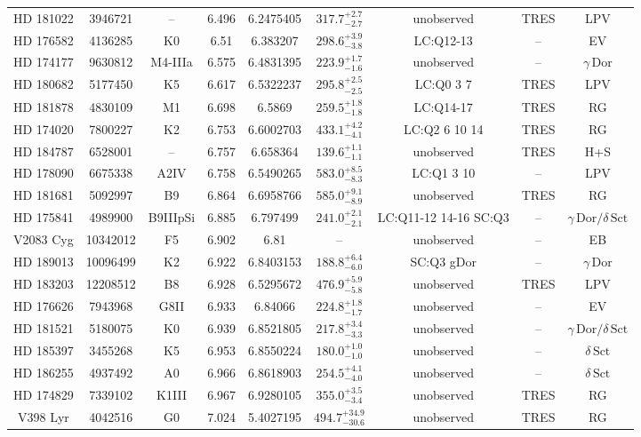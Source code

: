\begin{table*}
\begin{tabular}{ccccccccc}
HD 181022 & 3946721 & -- & 6.496 & 6.2475405 & $317.7^{+2.7}_{-2.7}$ & unobserved & TRES & LPV \\
HD 176582 & 4136285 & K0 & 6.51 & 6.383207 & $298.6^{+3.9}_{-3.8}$ & LC:Q12-13 & -- & EV \\
HD 174177 & 9630812 & M4-IIIa & 6.575 & 6.4831395 & $223.9^{+1.7}_{-1.6}$ & unobserved & -- & $\gamma\,\text{Dor}$ \\
HD 180682 & 5177450 & K5 & 6.617 & 6.5322237 & $295.8^{+2.5}_{-2.5}$ & LC:Q0 3 7 & TRES & LPV \\
HD 181878 & 4830109 & M1 & 6.698 & 6.5869 & $259.5^{+1.8}_{-1.8}$ & LC:Q14-17 & TRES & RG \\
HD 174020 & 7800227 & K2 & 6.753 & 6.6002703 & $433.1^{+4.2}_{-4.1}$ & LC:Q2 6 10 14 & TRES & RG \\
HD 184787 & 6528001 & -- & 6.757 & 6.658364 & $139.6^{+1.1}_{-1.1}$ & unobserved & TRES & H+S \\
HD 178090 & 6675338 & A2IV & 6.758 & 6.5490265 & $583.0^{+8.5}_{-8.3}$ & LC:Q1 3 10 & -- & LPV \\
HD 181681 & 5092997 & B9 & 6.864 & 6.6958766 & $585.0^{+9.1}_{-8.9}$ & unobserved & TRES & RG \\
HD 175841 & 4989900 & B9IIIpSi & 6.885 & 6.797499 & $241.0^{+2.1}_{-2.1}$ & LC:Q11-12 14-16 SC:Q3 & -- & $\gamma\,\text{Dor} /\delta\,\text{Sct}$ \\
V2083 Cyg & 10342012 & F5 & 6.902 & 6.81 & -- & unobserved & -- & EB \\
HD 189013 & 10096499 & K2 & 6.922 & 6.8403153 & $188.8^{+6.4}_{-6.0}$ & SC:Q3 gDor & -- & $\gamma\,\text{Dor}$ \\
HD 183203 & 12208512 & B8 & 6.928 & 6.5295672 & $476.9^{+5.9}_{-5.8}$ & unobserved & TRES & LPV \\
HD 176626 & 7943968 & G8II & 6.933 & 6.84066 & $224.8^{+1.8}_{-1.7}$ & unobserved & -- & EV \\
HD 181521 & 5180075 & K0 & 6.939 & 6.8521805 & $217.8^{+3.4}_{-3.3}$ & unobserved & -- & $\gamma\,\text{Dor} /\delta\,\text{Sct}$ \\
HD 185397 & 3455268 & K5 & 6.953 & 6.8550224 & $180.0^{+1.0}_{-1.0}$ & unobserved & -- & $\delta\,\text{Sct}$ \\
HD 186255 & 4937492 & A0 & 6.966 & 6.8618903 & $254.5^{+4.1}_{-4.0}$ & unobserved & -- & $\delta\,\text{Sct}$ \\
HD 174829 & 7339102 & K1III & 6.967 & 6.9280105 & $355.0^{+3.5}_{-3.4}$ & unobserved & TRES & RG \\
V398 Lyr & 4042516 & G0 & 7.024 & 5.4027195 & $494.7^{+34.9}_{-30.6}$ & unobserved & TRES & RG \\

\end{tabular}
\end{table*}
